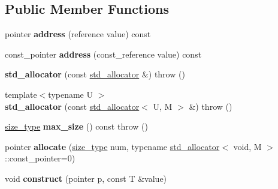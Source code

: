 \subsection*{Public Member Functions}
\begin{DoxyCompactItemize}
\item 
\hypertarget{classdlib_1_1std__allocator_a4e17c6c2caae5fc0178d2a42733f63cf}{
pointer {\bfseries address} (reference value) const }
\label{classdlib_1_1std__allocator_a4e17c6c2caae5fc0178d2a42733f63cf}

\item 
\hypertarget{classdlib_1_1std__allocator_adcdfc59fa674f9bce14d90eba3a8d351}{
const\_\-pointer {\bfseries address} (const\_\-reference value) const }
\label{classdlib_1_1std__allocator_adcdfc59fa674f9bce14d90eba3a8d351}

\item 
\hypertarget{classdlib_1_1std__allocator_a1e2e802bcf418673b568e11473f71782}{
{\bfseries std\_\-allocator} (const \hyperlink{classdlib_1_1std__allocator}{std\_\-allocator} \&)  throw ()}
\label{classdlib_1_1std__allocator_a1e2e802bcf418673b568e11473f71782}

\item 
\hypertarget{classdlib_1_1std__allocator_acd493e4b05f8589fa5214159a1625e58}{
{\footnotesize template$<$typename U $>$ }\\{\bfseries std\_\-allocator} (const \hyperlink{classdlib_1_1std__allocator}{std\_\-allocator}$<$ U, M $>$ \&)  throw ()}
\label{classdlib_1_1std__allocator_acd493e4b05f8589fa5214159a1625e58}

\item 
\hypertarget{classdlib_1_1std__allocator_ad8334724133fd86157d3bcbc54b12af9}{
\hyperlink{classdlib_1_1std__allocator_afbdfb9dc5c127fd82f2b1c9f3b1989bf}{size\_\-type} {\bfseries max\_\-size} () const   throw ()}
\label{classdlib_1_1std__allocator_ad8334724133fd86157d3bcbc54b12af9}

\item 
\hypertarget{classdlib_1_1std__allocator_aa8bd55902d29ed0c6bd399af7e6af18b}{
pointer {\bfseries allocate} (\hyperlink{classdlib_1_1std__allocator_afbdfb9dc5c127fd82f2b1c9f3b1989bf}{size\_\-type} num, typename \hyperlink{classdlib_1_1std__allocator}{std\_\-allocator}$<$ void, M $>$::const\_\-pointer=0)}
\label{classdlib_1_1std__allocator_aa8bd55902d29ed0c6bd399af7e6af18b}

\item 
\hypertarget{classdlib_1_1std__allocator_a0ccbc8f582451d0d76756f56b97ab3a8}{
void {\bfseries construct} (pointer p, const T \&value)}
\label{classdlib_1_1std__allocator_a0ccbc8f582451d0d76756f56b97ab3a8}


\end{DoxyCompactItemize}
